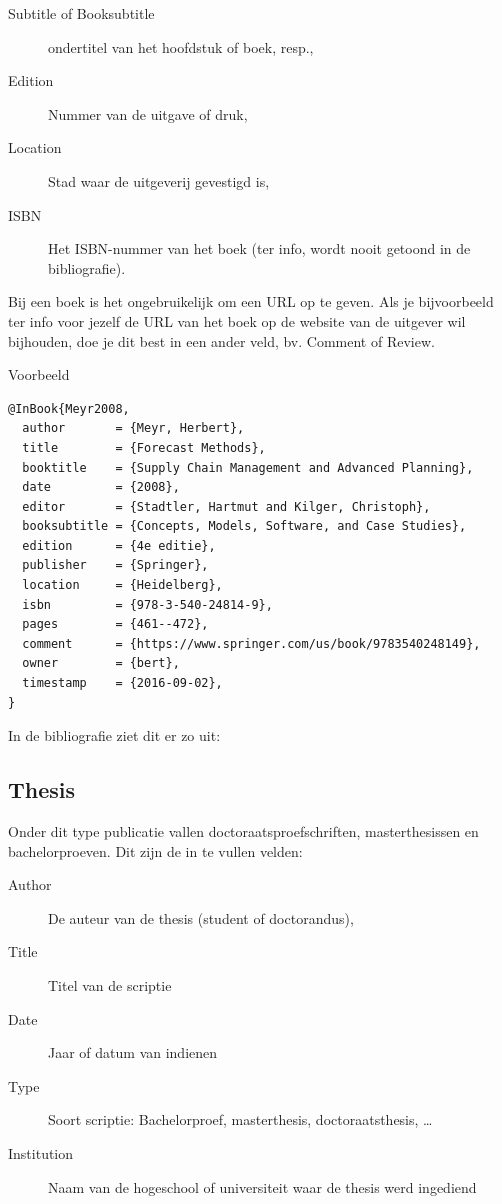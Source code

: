 \begin{description}
  \item[Subtitle of Booksubtitle] ondertitel van het hoofdstuk of boek, resp.,
  \item[Edition] Nummer van de uitgave of druk,
  \item[Location] Stad waar de uitgeverij gevestigd is,
  \item[ISBN] Het ISBN-nummer van het boek (ter info, wordt nooit getoond in de bibliografie).
\end{description}

Bij een boek is het ongebruikelijk om een URL op te geven. Als je bijvoorbeeld ter info voor jezelf de URL van het boek op de website van de uitgever wil bijhouden, doe je dit best in een ander veld, bv. Comment of Review.

Voorbeeld
\begin{verbatim}
@InBook{Meyr2008,
  author       = {Meyr, Herbert},
  title        = {Forecast Methods},
  booktitle    = {Supply Chain Management and Advanced Planning},
  date         = {2008},
  editor       = {Stadtler, Hartmut and Kilger, Christoph},
  booksubtitle = {Concepts, Models, Software, and Case Studies},
  edition      = {4e editie},
  publisher    = {Springer},
  location     = {Heidelberg},
  isbn         = {978-3-540-24814-9},
  pages        = {461--472},
  comment      = {https://www.springer.com/us/book/9783540248149},
  owner        = {bert},
  timestamp    = {2016-09-02},
}
\end{verbatim}

In de bibliografie ziet dit er zo uit:

\subsection{Thesis}%
\label{ssec:thesis}

Onder dit type publicatie vallen doctoraatsproefschriften, masterthesissen en bachelorproeven. Dit zijn de in te vullen velden:

\begin{description}
  \item[Author] De auteur van de thesis (student of doctorandus),
  \item[Title] Titel van de scriptie
  \item[Date] Jaar of datum van indienen
  \item[Type] Soort scriptie: Bachelorproef, masterthesis, doctoraatsthesis, \ldots
  \item[Institution] Naam van de hogeschool of universiteit waar de thesis werd ingediend
\end{description}

